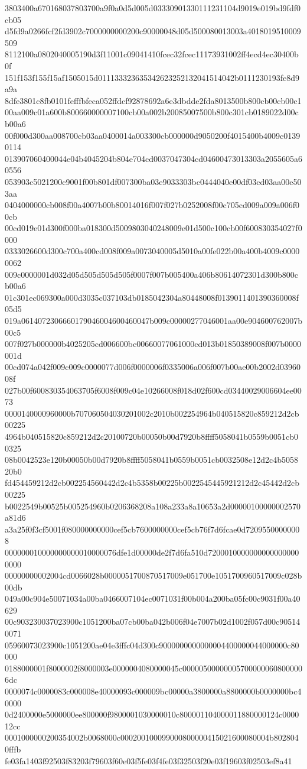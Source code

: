 3803400a670168037803700a9f0a0d5d005d03330901330111231104d9019e019bd9fdf0cb05
d5fd9a0266fcf2fd3902c7000000000200c90000048d05d500080013003a4018019510009509
8112100a0802040005190d3f11001c09041410fcec32fcec11173931002ff4ecd4ec30400b0f
151f153f155f15af1505015d011133323635342623252132041514042b0111230193fe8d9a9a
8dfe3801c8fb0101fefffbfeca052ffdcf92878692a6e3dbdde2fda8013500b800cb00cb00c1
00aa009c01a600b800660000007100cb00a002b20085007500b800c301cb0189022d00cb00a6
00f000d300aa008700cb03aa0400014a003300cb000000d9050200f4015400b4009c01390114
013907060400044e04b4045204b804e704cd0037047304cd04600473013303a2055605a60556
053903c5021200c9001f00b801df007300ba03e9033303bc0444040e00df03cd03aa00e503aa
0404000000cb008f00a4007b00b80014016f007f027b0252008f00c705cd009a009a006f00cb
00cd019e01d300f000ba018300d5009803040248009e01d500c100cb00f600830354027f0000
0333026600d300c700a400cd008f009a0073040005d5010a00fe022b00a400b4009c00000062
009c0000001d032d05d505d505d505f0007f007b005400a406b80614072301d300b800cb00a6
01c301ec069300a000d3035c037103db0185042304a80448008f0139011401390360008f05d5
019a0614072306660179046004600460047b009c00000277046001aa00e904600762007b00c5
007f027b000000b4025205cd006600bc00660077061000cd013b01850389008f007b0000001d
00cd074a042f009c009c0000077d006f0000006f0335006a006f007b00ae00b2002d0396008f
027b00f600830354063705f6008f009c04e10266008f018d02f600cd03440029006604ee0073
0000140000960000b707060504030201002c2010b002254964b040515820c859212d2cb00225
4964b040515820c859212d2c20100720b00050b00d7920b8ffff5058041b0559b0051cb00325
08b0042523e120b00050b00d7920b8ffff5058041b0559b0051cb0032508e12d2c4b505820b0
fd454459212d2cb002254560442d2c4b5358b00225b0022545445921212d2c45442d2cb00225
b0022549b00525b005254960b0206368208a108a233a8a10653a2d00000100000002570a81d6
a3a25f0f3cf5001f080000000000cef5cb7600000000cef5cb76f7d6fcae0d72095500000008
000000010000000000010000076dfe1d00000de2f7d6fa510d72000100000000000000000000
00000000002004cd0066028b0000051700870517009e051700e1051700960517009c028b00db
049a00c904e50071034a00ba0466007104ec0071031f00b004a200ba05fc00c9031f00a40629
00c903230037023900c1051200ba07cb00ba042b006f04e7007b02d1002f057d00c905140071
05960073023900c1051200ae04e3fffc04d300c9000000000000004400000044000000c80000
0188000001f8000002f8000003e0000004080000045c000005000000057000000608000006dc
0000074c0000083c000008e40000093c000009bc00000a3800000a8800000b0000000bc40000
0d2400000e5000000ee800000f9800001030000010c800001104000011880000124c000012cc
0001000000200354002b0068000c000200100099000800000415021600080004b8028040fffb
fe03fa1403f92503f83203f79603f60e03f5fe03f4fe03f32503f20e03f19603f02503ef8a41
